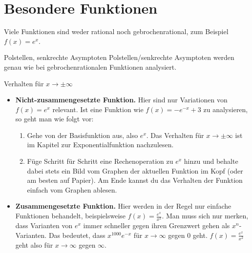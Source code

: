 \section{Besondere Funktionen}

Viele Funktionen sind weder rational noch gebrochenrational, zum Beispiel $f(x)=e^x$.

\begin{bla}{Polstellen, senkrechte Asymptoten}
  Polstellen/senkrechte Asymptoten werden genau wie bei gebrochenrationalen Funktionen analysiert.
\end{bla}

\begin{bla}{Verhalten für $x \rightarrow \pm \infty$}
  \begin{itemize}
    \item \textbf{Nicht-zusammengesetzte Funktion.} Hier sind nur Variationen von $f(x)=e^x$ relevant. Ist eine Funktion wie $f(x)=-e^{-x}+3$ zu analysieren, so geht man wie folgt vor:
    \begin{enumerate}
      \item Gehe von der Basisfunktion aus, also $e^x$. Das Verhalten für $x \rightarrow \pm \infty$ ist im Kapitel zur Exponentialfunktion nachzulesen.
      \item Füge Schritt für Schritt eine Rechenoperation zu $e^x$ hinzu und behalte dabei stets ein Bild vom Graphen der aktuellen Funktion im Kopf (oder am besten auf Papier). Am Ende kannst du das Verhalten der Funktion einfach vom Graphen ablesen.
    \end{enumerate}
    \item \textbf{Zusammengesetzte Funktion.} Hier werden in der Regel nur einfache Funktionen behandelt, beispielsweise $f(x)=\frac{e^x}{x^2}$. Man muss sich nur merken, dass Varianten von $e^x$ immer schneller gegen ihren Grenzwert gehen als $x^n$-Varianten. Das bedeutet, dass $x^{1000}e^{-x}$ für $x \rightarrow \infty$ gegen $0$ geht. $f(x)=\frac{e^x}{x^2}$ geht also für $x \rightarrow \infty$ gegen $\infty$.
  \end{itemize}
\end{bla}

\clearpage

